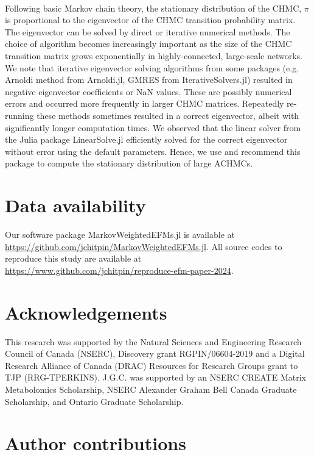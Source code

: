 \documentclass[12pt]{article}
\begin{document}
\hspace*{0.1cm}\\\noindent

Following basic Markov chain theory, the stationary distribution of the
CHMC, $\pi$ is proportional to the eigenvector of the CHMC transition
probability matrix. The eigenvector can be solved by direct or iterative
numerical methods. The choice of algorithm becomes increasingly important
as the size of the CHMC transition matrix grows exponentially in
highly-connected, large-scale networks. We note that iterative eigenvector
solving algorithms from some packages (e.g. Arnoldi method from
Arnoldi.jl, GMRES from IterativeSolvers.jl) resulted in negative
eigenvector coefficients or NaN values. These are possibly numerical
errors and occurred more frequently in larger CHMC matrices. Repeatedly
re-running these methods sometimes resulted in a correct eigenvector,
albeit with significantly longer computation times. We observed that the
linear solver from the Julia package LinearSolve.jl efficiently solved for
the correct eigenvector without error using the default parameters. Hence,
we use and recommend this package to compute the stationary distribution
of large ACHMCs.

\fi

\section*{Data availability}

Our software package MarkovWeightedEFMs.jl is available at
\url{https://github.com/jchitpin/MarkovWeightedEFMs.jl}. All source codes
to reproduce this study are available at
\url{https://www.github.com/jchitpin/reproduce-efm-paper-2024}.

\section*{Acknowledgements}

This research was supported by the Natural Sciences and Engineering
Research Council of Canada (NSERC), Discovery grant RGPIN/06604-2019 and
a Digital Research Alliance of Canada (DRAC) Resources for Research Groups
grant to TJP (RRG-TPERKINS). J.G.C. was supported by an NSERC CREATE
Matrix Metabolomics Scholarship, NSERC Alexander Graham Bell Canada
Graduate Scholarship, and Ontario Graduate Scholarship.

\section*{Author contributions}
\end{document}
